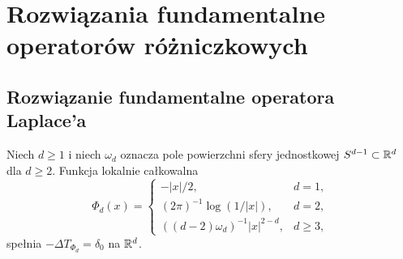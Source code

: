 \section{Rozwiązania fundamentalne operatorów różniczkowych}
\providecommand{\atlasref}[2]{#2}

\subsection{Rozwiązanie fundamentalne operatora Laplace'a}
\begin{twierdzenie}
\label{thm:dt-laplace}
Niech $d\ge1$ i niech $\omega_d$ oznacza pole powierzchni
sfery jednostkowej $S^{d-1}\subset\mathbb R^d$ dla $d\ge2$.
Funkcja lokalnie całkowalna
\begin{equation}\label{eq:dt-laplace-fundamental}
 \Phi_d(x)=\begin{cases}
 -|x|/2,&d=1,\\
 (2\pi)^{-1}\log(1/|x|),&d=2,\\
 ((d-2)\omega_d)^{-1}|x|^{2-d},&d\ge3,
 \end{cases}
\end{equation}
spełnia $-\Delta T_{\Phi_d}=\delta_0$ na $\mathbb R^d$.
\end{twierdzenie}

